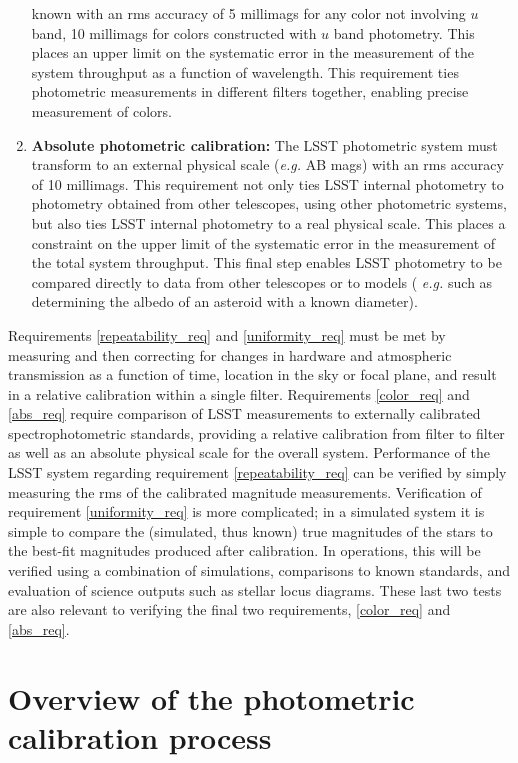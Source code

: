 \documentclass[12pt,preprint]{aastex}
\begin{document}
\begin{enumerate}
{known with an rms accuracy of 5 millimags for any color not involving $u$
band, 10 millimags for colors constructed with $u$ band
photometry. This places an upper limit on the systematic error in
the measurement of the system throughput as a function of
wavelength. This requirement ties photometric measurements in
different filters together, enabling precise measurement of colors. 
\label{color_req}}
\item{{\bf Absolute photometric calibration:} The LSST photometric
system must transform to an external physical scale ({\it e.g.} AB
mags) with an rms accuracy of 10 millimags. This requirement not only
ties LSST internal photometry to photometry obtained from other
telescopes, using other photometric systems, but also ties LSST
internal photometry to a real physical scale. This places a constraint
on the upper limit of the systematic error in the measurement of the
total system throughput. This final step enables LSST photometry to be
compared directly to data from other telescopes or to models ({\it
e.g.} such as determining the albedo of an asteroid with a known
diameter). \label{abs_req}}
\end{enumerate}

Requirements \ref{repeatability_req} and \ref{uniformity_req} must be
met by measuring and then correcting for changes in hardware and
atmospheric transmission as a function of time, location in the sky or
focal plane, and result in a relative calibration within a single
filter. Requirements \ref{color_req} and \ref{abs_req} require
comparison of LSST measurements to externally calibrated
spectrophotometric standards, providing a relative calibration from
filter to filter as well as an absolute physical scale for the overall
system.  Performance of the LSST system regarding requirement
\ref{repeatability_req} can be verified by simply measuring the rms of
the calibrated magnitude measurements. Verification of requirement
\ref{uniformity_req} is more complicated; in a simulated system it is
simple to compare the (simulated, thus known) true magnitudes of the
stars to the best-fit magnitudes produced after calibration. In
operations, this will be verified using a combination of simulations,
comparisons to known standards, and evaluation of science outputs such
as stellar locus diagrams. These last two tests are also relevant to
verifying the final two requirements, \ref{color_req} and
\ref{abs_req}.


\section{Overview of the photometric calibration process}
\label{sec:calib_overview}
\end{document}
